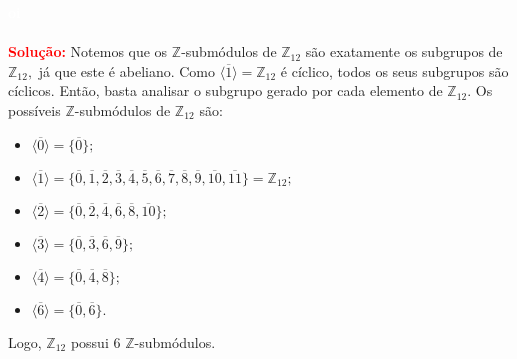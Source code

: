 \documentclass[11pt,a4paper]{article}
\newcommand{\solucao}[1]{
\textbf{\textcolor{white}{oi}\\ \\ \textcolor{red}{Solução:}} #1}
\begin{document}
\solucao{
Notemos que os $\mathbb{Z}$-submódulos de $\mathbb{Z}_{12}$ são exatamente os subgrupos de $\mathbb{Z}_{12},$ já que este é abeliano. Como $\langle \overline{1} \rangle = \mathbb{Z}_{12}$ é cíclico, todos os seus subgrupos são cíclicos. Então, basta analisar o subgrupo gerado por cada elemento de $\mathbb{Z}_{12}.$ Os possíveis $\mathbb{Z}$-submódulos de $\mathbb{Z}_{12}$ são:
\begin{itemize}
    \item $ \langle \overline{0} \rangle = \{ \overline{0} \};$
    \item $ \langle \overline{1} \rangle = \{ \overline{0}, \overline{1}, \overline{2},\overline{3}, \overline{4}, \overline{5}, \overline{6}, \overline{7}, \overline{8}, \overline{9}, \overline{10}, \overline{11}\} = \mathbb{Z}_{12};$
    \item $ \langle \overline{2} \rangle = \{ \overline{0},  \overline{2}, \overline{4},  \overline{6}, \overline{8},  \overline{10}\};$
    \item $ \langle \overline{3} \rangle = \{ \overline{0}, \overline{3}, \overline{6}, \overline{9}\};$
    \item $ \langle \overline{4} \rangle = \{ \overline{0}, \overline{4}, \overline{8}\} ;$
    \item $ \langle \overline{6} \rangle = \{ \overline{0},  \overline{6}\}.$
\end{itemize}

Logo, $\mathbb{Z}_{12}$ possui $6$ $\mathbb{Z}$-submódulos.

}
\end{document}
